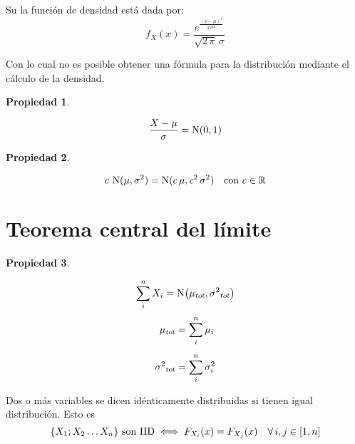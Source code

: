 \documentclass[a5paper,12pt,twoside]{book}
\newtheorem{prop}{{Propiedad}}[chapter]
\begin{document}
Su la función de densidad está dada por:
\begin{equation*}
    f_X(x) = \frac{e^{\tfrac{(x-\mu)^2}{2 \, \sigma^2}}}{\sqrt{2 \, \pi} \, \sigma}
\end{equation*}

Con lo cual no es posible obtener una fórmula para la distribución mediante el cálculo de la densidad.

\begin{mdframed}[style=PropertyFrame]
    \begin{prop}
    \end{prop}
    \begin{equation*}
        \frac{X-\mu}{\sigma} = \nor(0,1)
    \end{equation*}
\end{mdframed}

\begin{mdframed}[style=PropertyFrame]
    \begin{prop}
    \end{prop}
    \begin{equation*}
        c \, \nor(\mu,\sigma^2) = \nor(c \, \mu, c^2 \, \sigma^2) \quad \text{con } c \in \setR
    \end{equation*}
\end{mdframed}


\section{Teorema central del límite}

\begin{mdframed}[style=PropertyFrame]
    \begin{prop}
        \label{prop:TCL}
    \end{prop}
    \begin{equation*}
        \sum_i^n X_i = \fx[\nor]{\sub{\mu}{tot},\sub{\sigma^2}{tot}}
    \end{equation*}
    \begin{align*}
        \sub{\mu}{tot} &= \sum_i^n \mu_i
        \\[1ex]
        \sub{\sigma^2}{tot} &= \sum_i^n \sigma_i^2
    \end{align*}
\end{mdframed}

Dos o más variables se dicen idénticamente distribuidas si tienen igual distribución.
Esto es
\begin{equation*}
    \inBraces{X_1;X_2 \dots X_n} \text{ son IID} \iff F_{X_i}(x)=F_{X_j}(x) \quad \forall \, i,j \in [1,n]
\end{equation*}
\end{document}
